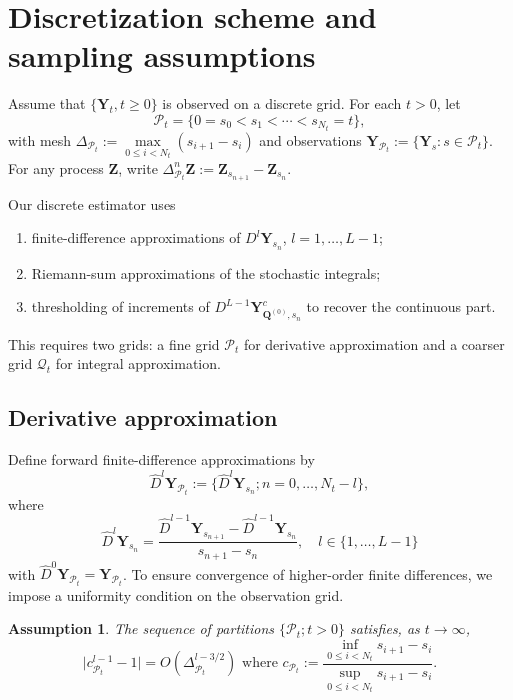 \documentclass[12pt]{amsart}
\newtheorem{assumption}{Assumption}[section]
\numberwithin{equation}{section}
\newcommand{\1}{\mathbf{1}}
\begin{document}
\section{Discretization scheme and sampling assumptions}
\label{discrete}
Assume that $\{\mathbf{Y}_t,t\geq 0 \}$ is observed on a discrete grid. For each $t>0$, let
\begin{equation*}
    \mathcal{P}_t=\{0=s_0<s_1<\cdots<s_{N_t}=t\},
\end{equation*}
with mesh $\Delta_{\mathcal{P}_t}:=\max\limits_{0\le i<N_t}(s_{i+1}-s_i)$ and observations $\mathbf{Y}_{\mathcal{P}_t}:=\{\mathbf{Y}_s:s\in\mathcal{P}_t\}$. For any process $\mathbf{Z}$, write $\Delta_{\mathcal{P}_t}^n\mathbf{Z}:=\mathbf{Z}_{s_{n+1}}-\mathbf{Z}_{s_n}$.

Our discrete estimator uses
\begin{enumerate}
    \item finite-difference approximations of $D^l\mathbf{Y}_{s_n}$, $l=1,\dots,L-1$;  
    \item Riemann-sum approximations of the stochastic integrals;  
    \item thresholding of increments of $D^{L-1}\mathbf{Y}^c_{\mathbf{Q}^{(0)},s_n}$ to recover the continuous part. 
\end{enumerate}
This requires two grids: a fine grid $\mathcal{P}_t$ for derivative approximation and a coarser grid $\mathcal{Q}_t$ for integral approximation.

\subsection{Derivative approximation}\label{Derivative approximation} \cite[Section 4.2]{lucchese2026estimation}
Define forward finite-difference approximations by
\begin{equation*}
    \hat{D}^l\mathbf{Y}_{\mathcal{P}_t}:=\{\hat{D}^l\mathbf{Y}_{s_n};n=0,\dots,N_t-l\},
\end{equation*}
where 
\begin{equation*}
    \hat{D}^l\mathbf{Y}_{s_n}=\frac{\hat{D}^{l-1}\mathbf{Y}_{s_{n+1}}-\hat{D}^{l-1}\mathbf{Y}_{s_n}}{s_{n+1}-s_n}, \quad l\in\{1,\dots,L-1\}
\end{equation*}
with $\hat{D}^0\mathbf{Y}_{\mathcal{P}_t} = \mathbf{Y}_{\mathcal{P}_t}$. To ensure convergence of higher-order finite differences, we impose a uniformity condition on the observation grid.
\begin{assumption}
\label{assumptionB1}
    The sequence of partitions $\{\mathcal{P}_t;t>0\}$ satisfies, as $t\to\infty$, 
    \begin{equation*}
        \vert c^{l-1}_{\mathcal{P}_t}-1\vert = O\left(\Delta^{l-3/2}_{\mathcal{P}_t}\right)\text{ where } c_{\mathcal{P}_t}:=\frac{\inf\limits_{0\leq i <N_t}s_{i+1}-s_i}{\sup\limits_{0\leq i <N_t}s_{i+1}-s_i}.
    \end{equation*}
\end{assumption}
\end{document}
